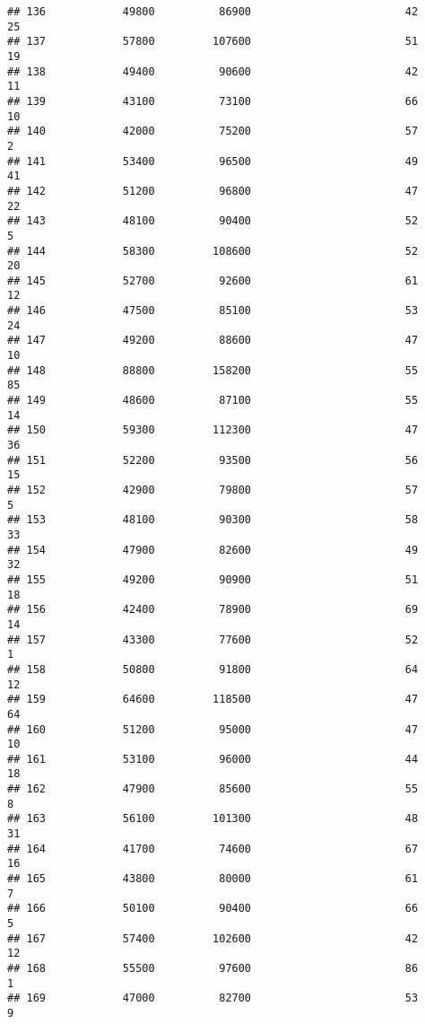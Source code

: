 \documentclass[
]{article}
\begin{document}
\begin{verbatim}
## 136            49800          86900                        42           25
## 137            57800         107600                        51           19
## 138            49400          90600                        42           11
## 139            43100          73100                        66           10
## 140            42000          75200                        57            2
## 141            53400          96500                        49           41
## 142            51200          96800                        47           22
## 143            48100          90400                        52            5
## 144            58300         108600                        52           20
## 145            52700          92600                        61           12
## 146            47500          85100                        53           24
## 147            49200          88600                        47           10
## 148            88800         158200                        55           85
## 149            48600          87100                        55           14
## 150            59300         112300                        47           36
## 151            52200          93500                        56           15
## 152            42900          79800                        57            5
## 153            48100          90300                        58           33
## 154            47900          82600                        49           32
## 155            49200          90900                        51           18
## 156            42400          78900                        69           14
## 157            43300          77600                        52            1
## 158            50800          91800                        64           12
## 159            64600         118500                        47           64
## 160            51200          95000                        47           10
## 161            53100          96000                        44           18
## 162            47900          85600                        55            8
## 163            56100         101300                        48           31
## 164            41700          74600                        67           16
## 165            43800          80000                        61            7
## 166            50100          90400                        66            5
## 167            57400         102600                        42           12
## 168            55500          97600                        86            1
## 169            47000          82700                        53            9

\end{verbatim}
\end{document}
